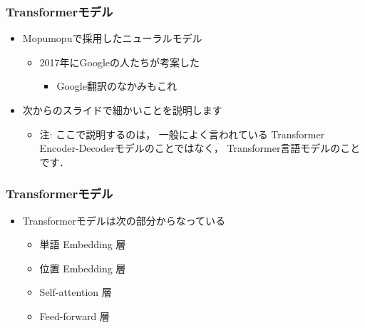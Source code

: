 \documentclass[14pt]{beamer}
\begin{document}
\begin{frame}
	\frametitle{Transformerモデル}

	\begin{itemize}
		\item Mopumopuで採用したニューラルモデル
			\begin{itemize}
				\item 2017年にGoogleの人たちが考案した
					\begin{itemize}
						\item Google翻訳のなかみもこれ
					\end{itemize}
			\end{itemize}
		\item 次からのスライドで細かいことを説明します
			\begin{itemize}
				\item {\scriptsize 注: ここで説明するのは，
					一般によく言われている
					Transformer Encoder-Decoderモデルのことではなく，
					Transformer言語モデルのことです．}
			\end{itemize}
	\end{itemize}
\end{frame}

\begin{frame}
	\frametitle{Transformerモデル}

	\begin{itemize}
		\item Transformerモデルは次の部分からなっている
			\begin{itemize}
				\item 単語 Embedding 層
				\item 位置 Embedding 層
				\item Self-attention 層
				\item Feed-forward 層
			\end{itemize}
	\end{itemize}

\end{frame}
\end{document}
